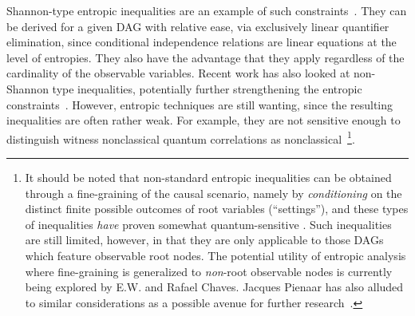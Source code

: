 \documentclass[aps,english,superscriptaddress,onecolumn,twoside,longbibliography,pra,floatfix,fleqn,nofootinbib]{revtex4-1}%
\theoremstyle{definition}
\begin{document}
Shannon-type entropic inequalities are an example of such constraints~\cite{steudel2010ancestors,fritz2012bell,fritz2013marginal,chaves2014novel,chaves2014informationinference}. They can be derived for a given DAG with relative ease, via exclusively linear quantifier elimination, since conditional independence relations are linear equations at the level of entropies. They also have the advantage that they apply regardless of the cardinality of the observable variables. Recent work has also looked at non-Shannon type inequalities, potentially further strengthening the entropic constraints~\cite{weilenmann2016entropic,pianaar2016interesting}. However, entropic techniques are still wanting, since the resulting inequalities are often rather weak. For example, they are not sensitive enough to distinguish witness nonclassical quantum correlations as nonclassical~\cite{fritz2012bell,weilenmann2016entropic}\footnote{It should be noted that non-standard entropic inequalities can be obtained through a fine-graining of the causal scenario, namely by \emph{conditioning} on the distinct finite possible outcomes of root variables (``settings''), and these types of inequalities \emph{have} proven somewhat quantum-sensitive \cite{braunstein1988entropic,SchumacherInequality,chaves2014novel}. Such inequalities are still limited, however, in that they are only applicable to those DAGs which feature observable root nodes. The potential utility of entropic analysis where fine-graining is generalized to \emph{non}-root observable nodes is currently being explored by E.W. and Rafael Chaves. Jacques Pienaar has also alluded to similar considerations as a possible avenue for further research~\cite{pianaar2016interesting}.}.

\end{document}
